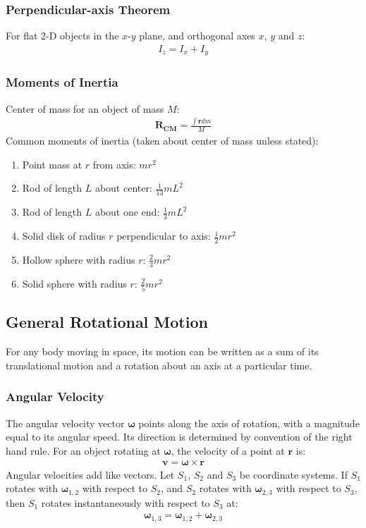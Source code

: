 \documentclass[11pt, letterpaper]{article}
\newcommand{\ve}[1]{
  \ensuremath{\bm{#1}}}	               %
\begin{document}
\begin{multicols*}{3}
\subsubsection{Perpendicular-axis Theorem}
For flat 2-D objects in the $x$-$y$ plane, and orthogonal axes $x$, $y$ and $z$:
\begin{align*}
  I_z=I_x+I_y
\end{align*}
\subsubsection{Moments of Inertia}
Center of mass for an object of mass $M$:
\begin{align*}
  \ve{R_\text{CM}}=\frac{\int\ve{r}dm}{M}
\end{align*}
Common moments of inertia (taken about center of mass unless stated):
\begin{enumerate}
  \setlength{\itemsep}{2mm}
\item Point mass at $r$ from axis: $mr^2$
\item Rod of length $L$ about center: $\frac{1}{13}mL^2$
\item Rod of length $L$ about one end: $\frac{1}{3}mL^2$
\item Solid disk of radius $r$ perpendicular to axis: $\frac{1}{2}mr^2$
\item Hollow sphere with radius $r$: $\frac{2}{3}mr^2$
\item Solid sphere with radius $r$: $\frac{2}{5}mr^2$
\end{enumerate}
\subsection{General Rotational Motion}
For any body moving in space, its motion can be written as a sum of its
translational motion and a rotation about an axis at a particular time.
\subsubsection{Angular Velocity}
The angular velocity vector $\ve{\omega}$ points along the axis of rotation,
with a magnitude equal to its angular speed. Its direction is determined by
convention of the right hand rule. For an object rotating at $\ve{\omega}$, the
velocity of a point at $\ve{r}$ is:
\begin{align*}
  \ve{v} = \ve{\omega} \times \ve{r}
\end{align*}
Angular velocities add like vectors. Let $S_1$, $S_2$ and $S_3$ be coordinate
systems. If $S_1$ rotates with $\ve{\omega}_{1, 2}$ with respect to $S_2$, and
$S_2$ rotates with $\ve{\omega}_{2, 3}$ with respect to $S_3$, then $S_1$
rotates instantaneously with respect to $S_3$ at:
\begin{align*}
  \ve{\omega}_{1, 3} = \ve{\omega}_{1, 2} + \ve{\omega}_{2, 3}
\end{align*}

\end{multicols*}
\end{document}
